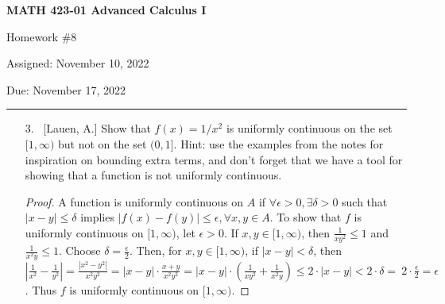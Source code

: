 \documentclass[10pt]{article}
\theoremstyle{definition}
\begin{document}
\pagestyle{empty}  %

\begin{center}  %

{\bf MATH 423-01  Advanced Calculus I

Homework \#8

Assigned: November 10, 2022

Due: November 17, 2022}

\end{center}

\medskip

\hrule   %

\bigskip


\begin{enumerate}

\item[3.]  ~[Lauen, A.] Show that $f(x) = 1/x^2$ is uniformly continuous on the set $[1,\infty)$ but not on the set $(0,1]$.  Hint: use the examples from the notes for inspiration on bounding extra terms, and don't forget that we have a tool for showing that a function is not uniformly continuous. 


\begin{proof}
A function is uniformly continuous on $A$ if $\forall \epsilon > 0, \exists \delta > 0$ such that $|x-y| \leq \delta$ implies $|f(x)-f(y)| \leq \epsilon, \forall x, y \in A$.  To show that $f$ is uniformly continuous on $[1,\infty)$, let $\epsilon > 0$.  If $x,y \in [1,\infty)$, then $\frac{1}{xy^2} \leq 1$ and $\frac{1}{x^2y} \leq 1$.  Choose $\delta=\frac{\epsilon}{2}.$ Then, for $x,y \in [1,\infty)$, if $|x-y|<\delta$, then $|\frac{1}{x^2}-\frac{1}{y^2}|=\frac{|x^2-y^2|}{x^2y^2}=|x-y|\cdot \frac{x+y}{x^2y^2}=|x-y|\cdot (\frac{1}{xy^2}+\frac{1}{x^2y})\leq 2\cdot|x-y| < 2 \cdot \delta = \ 2\cdot \frac{\epsilon}{2}=\epsilon$.  Thus $f$ is uniformly continuous on $[1,\infty)$.


\end{proof}
\end{enumerate}
\end{document}
